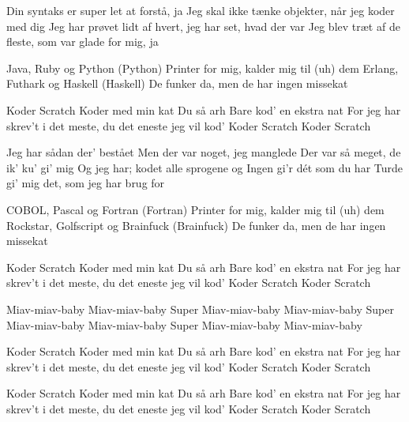 \documentclass[a4paper,11pt]{article}
\begin{document}
\begin{song}
 Din syntaks er super let at forstå, ja			
Jeg skal ikke tænke objekter, når jeg koder med dig	
Jeg har prøvet lidt af hvert, jeg har set, hvad der var
Jeg blev træt af de fleste, som var glade for mig, ja	

Java, Ruby og Python (Python)					
Printer for mig, kalder mig til (uh) dem			
Erlang, Futhark og Haskell (Haskell)			
De funker da, men de har ingen missekat		

Koder Scratch							
Koder med min kat							
Du så arh								
Bare kod' en ekstra nat						
For jeg har skrev't i det meste, du det eneste jeg vil kod'	
Koder Scratch							
Koder Scratch							

Jeg har sådan der' bestået					
Men der var noget, jeg manglede				
Der var så meget, de ik' ku' gi' mig			
Og jeg har; kodet alle sprogene og				
Ingen gi'r dét som du har					
Turde gi' mig det, som jeg har brug for			

COBOL, Pascal og Fortran (Fortran) 				
Printer for mig, kalder mig til (uh) dem			
Rockstar, Golfscript og Brainfuck (Brainfuck)		
De funker da, men de har ingen missekat			

Koder Scratch							
Koder med min kat							
Du så arh								
Bare kod' en ekstra nat						
For jeg har skrev't i det meste, du det eneste jeg vil kod' 
Koder Scratch							
Koder Scratch							

 Miav-miav-baby							
Miav-miav-baby							
Super Miav-miav-baby						
Miav-miav-baby							
Super Miav-miav-baby						
Miav-miav-baby							
Super Miav-miav-baby						
Miav-miav-baby							

Koder Scratch							
Koder med min kat							
Du så arh								
Bare kod' en ekstra nat						
For jeg har skrev't i det meste, du det eneste jeg vil kod'	
Koder Scratch							
Koder Scratch							

Koder Scratch							
Koder med min kat							
Du så arh								
Bare kod' en ekstra nat						
For jeg har skrev't i det meste, du det eneste jeg vil kod'	
Koder Scratch							
Koder Scratch


\end{song}
\end{document}

